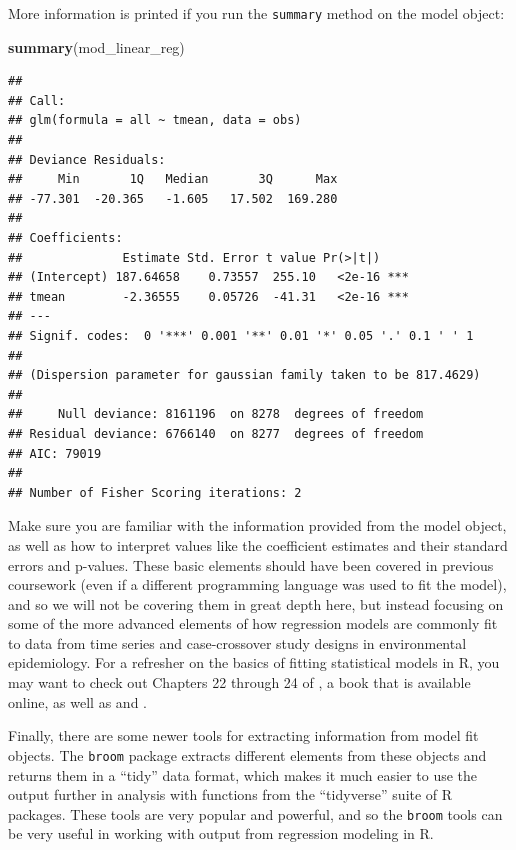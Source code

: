 \documentclass[
]{book}
\newenvironment{Shaded}{\begin{snugshade}}{\end{snugshade}}
\newcommand{\KeywordTok}[1]{\textcolor[rgb]{0.13,0.29,0.53}{\textbf{#1}}}
\newcommand{\NormalTok}[1]{#1}
\begin{document}
More information is printed if you run the \texttt{summary} method on the model
object:

\begin{Shaded}
\begin{Highlighting}[]
\KeywordTok{summary}\NormalTok{(mod_linear_reg)}
\end{Highlighting}
\end{Shaded}

\begin{verbatim}
## 
## Call:
## glm(formula = all ~ tmean, data = obs)
## 
## Deviance Residuals: 
##     Min       1Q   Median       3Q      Max  
## -77.301  -20.365   -1.605   17.502  169.280  
## 
## Coefficients:
##              Estimate Std. Error t value Pr(>|t|)    
## (Intercept) 187.64658    0.73557  255.10   <2e-16 ***
## tmean        -2.36555    0.05726  -41.31   <2e-16 ***
## ---
## Signif. codes:  0 '***' 0.001 '**' 0.01 '*' 0.05 '.' 0.1 ' ' 1
## 
## (Dispersion parameter for gaussian family taken to be 817.4629)
## 
##     Null deviance: 8161196  on 8278  degrees of freedom
## Residual deviance: 6766140  on 8277  degrees of freedom
## AIC: 79019
## 
## Number of Fisher Scoring iterations: 2
\end{verbatim}

Make sure you are familiar with the information provided from the model object,
as well as how to interpret values like the coefficient estimates and their
standard errors and p-values. These basic elements should have been covered in
previous coursework (even if a different programming language was used to fit
the model), and so we will not be covering them in great depth here, but instead
focusing on some of the more advanced elements of how regression models are
commonly fit to data from time series and case-crossover study designs in
environmental epidemiology. For a refresher on the basics of fitting
statistical models in R, you may want to check out Chapters 22 through 24 of
\citet{wickham2016r}, a book that is available online, as well as \citet{dunn2018generalized1} and
\citet{james2013introduction3} .

Finally, there are some newer tools for extracting information from model fit
objects. The \texttt{broom} package extracts different elements from these objects
and returns them in a ``tidy'' data format, which makes it much easier to use
the output further in analysis with functions from the ``tidyverse'' suite of
R packages. These tools are very popular and powerful, and so the \texttt{broom} tools
can be very useful in working with output from regression modeling in R.
\end{document}
